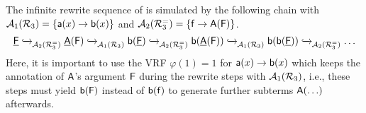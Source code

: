 \begin{example}\label{ex:ADPs-for-redex-creation-2}
  The infinite rewrite sequence of
   is simulated by the following chain with
   $\mathcal{A}_{1}(\mathcal{R}_3) = \{ \mathsf{a}(x) \to \mathsf{b}(x)\}$
    and $\mathcal{A}_{2}(\mathcal{R}_3^{=}) = \{\mathsf{f} \to \mathsf{A}(\mathsf{F})\}$.
    \[\underline{\tF}
    \tored{}{}{\ADPairBase{\R_3^{=}}} \underline{\tA}(\tF) \tored{}{}{\ADPairMain{\R_3}} \tb(\underline{\tF})
    \tored{}{}{\ADPairBase{\R_3^{=}}} \tb(\underline{\tA}(\tF)) \tored{}{}{\ADPairMain{\R_3}}\tb(\tb(\underline{\tF}))  \tored{}{}{\ADPairBase{\R_3^{=}}}
    \ldots\]
    Here, it is important to use the VRF $\varphi(1) = 1$ for $\mathsf{a}(x) \to \mathsf{b}(x)$
    which keeps the annotation of $\mathsf{A}$'s argument
    $\mathsf{F}$ during the rewrite steps with $\mathcal{A}_{1}(\mathcal{R}_3)$, i.e., these steps must yield
    $\mathsf{b}(\mathsf{F})$ instead of $\mathsf{b}(\mathsf{f})$    
    to generate further  subterms  $\mathsf{A}(\ldots)$ afterwards.
\end{example}
